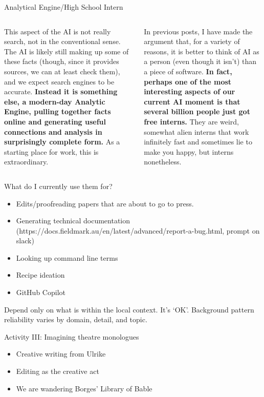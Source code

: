 \documentclass[aspectratio=169]{beamer}
\begin{document}
\begin{frame}{Analytical Engine/High School Intern}
\begin{columns}[t]
    \begin{column}{.5\textwidth}
        This aspect of the AI is not really search, not in the conventional sense. The AI is likely still making up some of these facts (though, since it provides sources, we can at least check them), and we expect search engines to be accurate. \textbf{Instead it is something else, a modern-day Analytic Engine, pulling together facts online and generating useful connections and analysis in surprisingly complete form.} As a starting place for work, this is extraordinary. \parencite{Mollick2023-sj}
    \end{column}
    \begin{column}{.5\textwidth}
        In previous posts, I have made the argument that, for a variety of reasons, it is better to think of AI as a person (even though it isn’t) than a piece of software. \textbf{In fact, perhaps one of the most interesting aspects of our current AI moment is that several billion people just got free interns.} They are weird, somewhat alien interns that work infinitely fast and sometimes lie to make you happy, but interns nonetheless. \parencite{Mollick2023-il}
    \end{column}
\end{columns}
    
		
\end{frame}


\begin{frame}{What do I currently use them for?}
    \begin{itemize}
        \item Edits/proofreading papers that are about to go to press.
	\item Generating technical documentation (https://docs.fieldmark.au/en/latest/advanced/report-a-bug.html, prompt on slack)
	\item Looking up command line terms
        \item Recipe ideation
        \item GitHub Copilot
    \end{itemize}
\vspace{1em}
{\Large Depend only on what is within the local context. It's `OK'. Background pattern reliability varies by domain, detail, and topic.}
		
\end{frame}
\begin{frame}{Activity III: Imagining theatre monologues}

\begin{itemize}
    \item Creative writing from Ulrike
    \item Editing as the creative act
    \item We are wandering Borges' Library of Bable
\end{itemize}
    
\end{frame}
\end{document}
